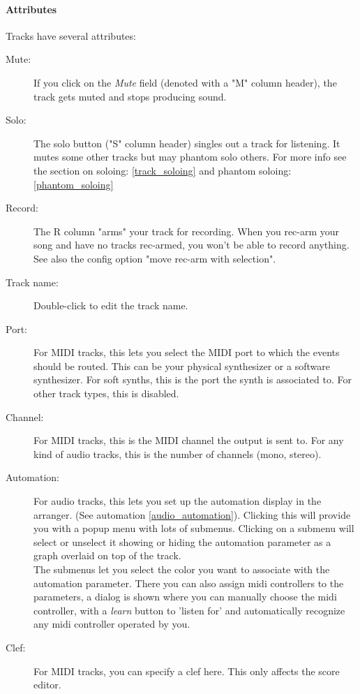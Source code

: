 \documentclass[a4paper]{report}
\begin{document}
\paragraph{Attributes}                                                    
Tracks have several attributes:
\begin{description}
\item [{Mute:}] If you click on the \emph{Mute} field (denoted with
a "M" column header), the track gets muted and stops producing sound.
\item [{Solo:}] \label{track_attr_solo} The solo button ("S" column
header) singles out a track for listening. It mutes
some other tracks but may phantom solo others. 
For more info see the section on soloing: \ref{track_soloing} and
phantom soloing: \ref{phantom_soloing}
\item [{Record:}] The R column "arms" your track for recording.
When you rec-arm your song and have no tracks rec-armed, you won't be
able to record anything. See also the config option "move rec-arm with    %
selection". 
\item [{Track name:}] Double-click to edit the track name.
\item [{Port:}] For MIDI tracks, this lets you select the MIDI
port to which the events should be routed. This can be your physical
synthesizer or a software synthesizer. For soft synths, this is the
port the synth is associated to. For other track types, this is disabled.
\item [{Channel:}] For MIDI tracks, this is the MIDI channel the
output is sent to. For any kind of audio tracks, this is the number of
channels (mono, stereo).
\item [{Automation:}] \label{track_attr_automation} For audio tracks,
this lets you set up the automation display in the arranger. 
(See automation \ref{audio_automation}). Clicking this will provide you
with a popup menu with lots of submenus. Clicking on a submenu will
select or unselect it showing or hiding the automation parameter as a 
graph overlaid on top of the track.\\
The submenus let you select the color you want to associate with the
automation parameter. There you can also assign midi controllers to
the parameters, a dialog is shown where you can manually choose the
midi controller, with a \emph{learn} button to 'listen for' and
automatically recognize any midi controller operated by you.

\item [{Clef:}] For MIDI tracks, you can specify a clef here. This
only affects the score editor.

\end{description}
\end{document}
